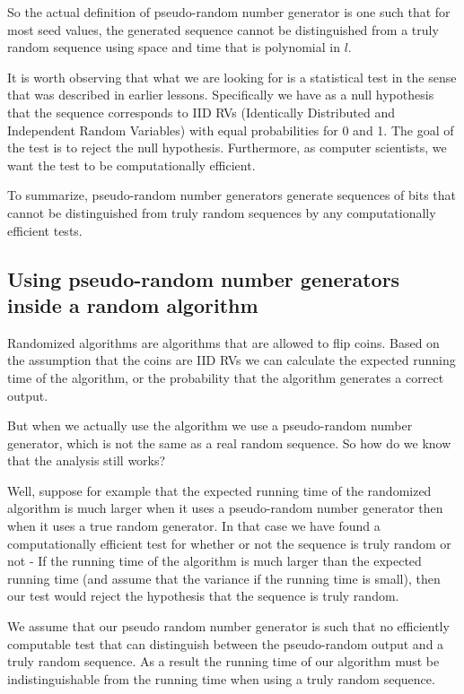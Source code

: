 So the actual definition of pseudo-random number generator is one such
that for most seed values, the generated sequence cannot be
distinguished from a truly random sequence using space and time that is
polynomial in $l$.

It is worth observing that what we are looking for is a statistical
test in the sense that was described in earlier lessons. Specifically
we have as a null hypothesis that the sequence corresponds to IID RVs
(Identically Distributed and Independent Random Variables) with equal
probabilities for 0 and 1. The goal of the test is to reject the null
hypothesis. Furthermore, as computer scientists, we want the test to
be computationally efficient.

To summarize, pseudo-random number generators generate sequences of
bits that cannot be distinguished from truly random sequences by any
computationally efficient tests.


\subsection{Using pseudo-random number generators inside a random algorithm}
Randomized algorithms are algorithms that are allowed to flip
coins. Based on the assumption that the coins are IID RVs we can
calculate the expected running time of the algorithm, or the
probability that the algorithm generates a correct output.

But when we actually use the algorithm we use a pseudo-random number
generator, which is not the same as a real random sequence. So how do
we know that the analysis still works?

Well, suppose for example that the expected running time of the
randomized algorithm is much larger when it uses a pseudo-random
number generator then when it uses a true random generator. In that
case we have found a computationally efficient test for whether or not
the sequence is truly random or not - If the running time of the
algorithm is much larger than the expected running time (and assume
that the variance if the running time is small), then our test would
reject the hypothesis that the sequence is truly random.

We assume that our pseudo random number generator is such that no
efficiently computable test that can distinguish between the
pseudo-random output and a truly random sequence. As a result the
running time of our algorithm must be indistinguishable from the
running time when using a truly random sequence.


